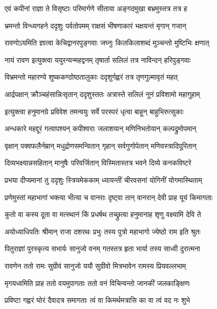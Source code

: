 \twolineshloka
{एवं कपीनां राज्ञा ते विसृष्टाः परिमार्गणे}
{सीताया अङ्गदमुखा बभ्रमुस्तत्र तत्र ह} %

\twolineshloka
{भ्रमन्तो विन्ध्यगहने ददृशुः पर्वतोपमम्}
{राक्षसं भीषणाकारं भक्षयन्तं मृगान् गजान्} %

\twolineshloka
{रावणोऽयमिति ज्ञात्वा केचिद्वानरपुङ्गवाः}
{जघ्नुः किलकिलाशब्दं मुञ्चन्तो मुष्टिभिः क्षणात्} %

\twolineshloka
{नायं रावण इत्युक्त्वा ययुरन्यन्महद्वनम्}
{तृषार्ता सलिलं तत्र नाविन्दन् हरिपुङ्गवाः} %

\twolineshloka
{विभ्रमन्तो महारण्ये शुष्ककण्ठोष्ठतालुकाः}
{ददृशुर्गह्वरं तत्र तृणगुल्मावृतं महत्} %

\twolineshloka
{आर्द्रपक्षान् क्रौञ्चहंसान्निःसृतान् ददृशुस्ततः}
{अत्रास्ते सलिलं नूनं प्रविशामो महागुहाम्} %

\twolineshloka
{इत्युक्त्वा हनुमानग्रे प्रविवेश तमन्वयुः}
{सर्वे परस्परं धृत्वा बाहून् बाहुभिरुत्सुकाः} %

\twolineshloka
{अन्धकारे महद्दूरं गत्वापश्यन् कपीश्वराः}
{जलाशयान् मणिनिभतोयान् कल्पद्रुमोपमान्} %

\twolineshloka
{वृक्षान् पक्वफलैर्नम्रान् मधुद्रोणसमन्वितान्}
{गृहान् सर्वगुणोपेतान् मणिवस्त्रादिपूरितान्} %

\twolineshloka
{दिव्यभक्ष्यान्नसहितान् मानुषैः परिवर्जितान्}
{विस्मितास्तत्र भवने दिव्ये कनकविष्टरे} %

\twolineshloka
{प्रभया दीप्यमानां तु ददृशुः स्त्रियमेककाम्}
{ध्यायन्तीं चीरवसनां योगिनीं योगमास्थिताम्} %

\twolineshloka
{प्रणेमुस्तां महाभागां भक्त्या भीत्या च वानराः}
{दृष्ट्वा तान् वानरान् देवी प्राह यूयं किमागताः} %

\twolineshloka
{कुतो वा कस्य दूता वा मत्स्थानं किं प्रधर्षथ}
{तच्छ्रुत्वा हनुमानाह शृणु वक्ष्यामि देवि ते} %

\twolineshloka
{अयोध्याधिपतिः श्रीमान् राजा दशरथः प्रभुः}
{तस्य पुत्रो महाभागो ज्येष्ठो राम इति श्रुतः} %

\twolineshloka
{पितुराज्ञां पुरस्कृत्य सभार्यः सानुजो वनम्}
{गतस्तत्र हृता भार्या तस्य साध्वी दुरात्मना} %

\twolineshloka
{रावणेन ततो रामः सुग्रीवं सानुजो ययौ}
{सुग्रीवो मित्रभावेन रामस्य प्रियवल्लभाम्} %

\twolineshloka
{मृगयध्वमिति प्राह ततो वयमुपागताः}
{ततो वनं विचिन्वन्तो जानकीं जलकाङ्क्षिणः} %

\twolineshloka
{प्रविष्टा गह्वरं घोरं दैवादत्र समागताः}
{त्वं वा किमर्थमत्रासि का वा त्वं वद नः शुभे} %

